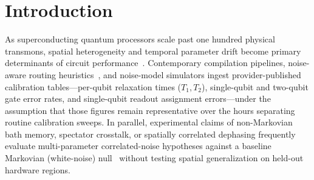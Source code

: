 \documentclass[twocolumn,aps,prapplied,superscriptaddress,floatfix]{revtex4-2}
\begin{document}
\begin{abstract}
calibration snapshots static for up to \RoKingstonUnchangedHours{}\,h rather than measurement crosstalk. Third, multiplexed dynamical-decoupling spectroscopy across \CnTotalCouplers{} couplers separated by $\ge\CnMinHops$ heavy-hex hops (\texttt{CN-01}, \CnShots{} circuit shots, \CnCouplerShots{} coupler-shots) yielded null mechanistic contrasts ($C_{\mathrm{DFS}}=\CnCdfsMeanPp$\,pp, $p_{\mathrm{Holm}}=\CnCdfsP$), yet white-noise-only generalized least squares falsely selected a non-local Ornstein--Uhlenbeck bath by $\Delta\mathrm{BIC}=\CnLockedDeltaBic$ before failing its preregistered \CnHeldOutCouplers{}-coupler held-out gate ($p=\CnHoPVal$); a \CnValTotalReps{}-replicate synthetic audit proves white-noise nulls misclassify \CnValOneFHThreePct\% of purely local $1/f$ dephasing, whereas local colored-noise nulls reduce false non-local claims to \CnValAThreeLocalFpPct\% and select independent local noise ($\mathrm{BIC}=\CnAThreeBicHZero$). We distill four operational governance rules for reproducible quantum hardware benchmarking.
\end{abstract}

\maketitle

\section{Introduction}\label{sec:intro}

As superconducting quantum processors scale past one hundred physical transmons, spatial heterogeneity and temporal parameter drift become primary determinants of circuit performance~\cite{klimov2018,burnett2019,proctor2020,thorbeck2023}. Contemporary compilation pipelines, noise-aware routing heuristics~\cite{nation2023}, and noise-model simulators ingest provider-published calibration tables—per-qubit relaxation times ($T_1, T_2$), single-qubit and two-qubit gate error rates, and single-qubit readout assignment errors—under the assumption that those figures remain representative over the hours separating routine calibration sweeps. In parallel, experimental claims of non-Markovian bath memory, spectator crosstalk, or spatially correlated dephasing frequently evaluate multi-parameter correlated-noise hypotheses against a baseline Markovian (white-noise) null~\cite{pazsilva2017,sung2021,tripathi2022} without testing spatial generalization on held-out hardware regions.
\end{document}
